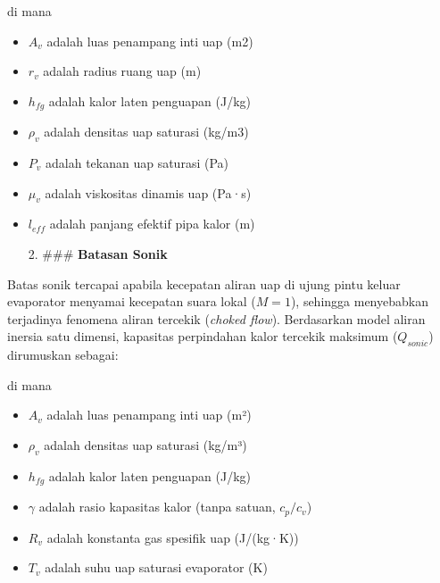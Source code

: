 \documentclass[
]{article}
\providecommand{\tightlist}{%
  \setlength{\itemsep}{0pt}\setlength{\parskip}{0pt}}
\begin{document}
\href{https://saxarona.github.io/mathjax-viewer/?input=Q_\%7Bvis\%7D\%3D\%5Cfrac\%7BA_\%7Bv\%7Dr_\%7Bv\%7D\%5E2h_\%7Bfg\%7D\%5Crho_\%7Bv\%7DP_\%7Bv\%7D\%7D\%7B16\%5Cmu_\%7Bv\%7Dl_\%7Beff\%7D\%7D\#0}{}

di mana

\begin{itemize}
\item
  \({A}_{v}\) adalah luas penampang inti uap (m2)\\
\item
  \({r}_{v}\) adalah radius ruang uap (m)\\
\item
  \({h}_{fg}\) adalah kalor laten penguapan (J/kg)\\
\item
  \({\rho }_{v}\) adalah densitas uap saturasi (kg/m3)\\
\item
  \({P}_{v}\) adalah tekanan uap saturasi (Pa)\\
\item
  \({\mu }_{v}\) adalah viskositas dinamis uap (Pa·s)\\
\item
  \({l}_{eff}\) adalah panjang efektif pipa kalor (m)

  2. \#\#\# \textbf{Batasan Sonik}
\end{itemize}

Batas sonik tercapai apabila kecepatan aliran uap di ujung pintu keluar
evaporator menyamai kecepatan suara lokal (\(M=1\)), sehingga
menyebabkan terjadinya fenomena aliran tercekik (\emph{choked flow}).
Berdasarkan model aliran inersia satu dimensi, kapasitas perpindahan
kalor tercekik maksimum (\({Q}_{sonic}\)) dirumuskan sebagai:

\href{https://saxarona.github.io/mathjax-viewer/?input=Q_\%7Bsonic\%7D\%3DA_v\%5Crho\%7B\%7D_vh_\%7Bfg\%7D\%5Cleft\%5B\%5Cfrac\%7B\%5Cgamma\%7B\%7DR_vT_v\%7D\%7B2(\%5Cgamma\%2B1)\%7D\%5Cright\%5D\%5E\%7B0.5\%7D\#0}{}

di mana

\begin{itemize}
\tightlist
\item
  \({A}_{v}\) adalah luas penampang inti uap (m²)\\
\item
  \({\rho }_{v}\) adalah densitas uap saturasi (kg/m³)\\
\item
  \({h}_{fg}\) adalah kalor laten penguapan (J/kg)\\
\item
  \(\gamma\) adalah rasio kapasitas kalor (tanpa satuan,
  \({c}_{p}/{c}_{v}\))\\
\item
  \({R}_{v}\) adalah konstanta gas spesifik uap (J/(kg·K))\\
\item
  \({T}_{v}\) adalah suhu uap saturasi evaporator (K)
\end{itemize}
\end{document}
